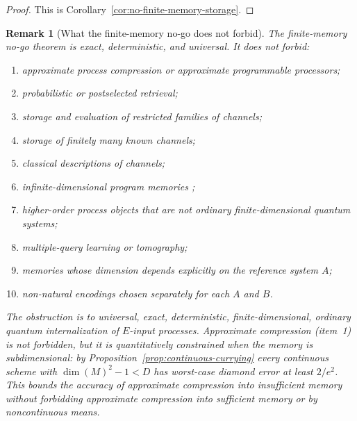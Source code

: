 \documentclass[11pt]{article}
\newtheorem{remark}[theorem]{Remark}
\begin{document}
\begin{proof}
This is Corollary~\ref{cor:no-finite-memory-storage}.
\end{proof}

\begin{remark}[What the finite-memory no-go does not forbid]
\label{rem:escape-routes}
The finite-memory no-go theorem is exact, deterministic, and universal. It
does not forbid:
\begin{enumerate}
\item approximate process compression or approximate programmable
processors;
\item probabilistic or postselected retrieval;
\item storage and evaluation of restricted families of channels;
\item storage of finitely many known channels;
\item classical descriptions of channels;
\item infinite-dimensional program memories \cite{GschwendtnerWinter2021};
\item higher-order process objects that are not ordinary finite-dimensional
quantum systems;
\item multiple-query learning or tomography;
\item memories whose dimension depends explicitly on the reference system
$A$;
\item non-natural encodings chosen separately for each $A$ and $B$.
\end{enumerate}
The obstruction is to universal, exact, deterministic, finite-dimensional,
ordinary quantum internalization of $E$-input processes. Approximate
compression (item~1) is not forbidden, but it is quantitatively constrained
when the memory is subdimensional: by Proposition~\ref{prop:continuous-currying}
every continuous scheme with $\dim(M)^2-1<D$ has worst-case diamond error at
least $2/e^2$. This bounds the accuracy of approximate compression into
insufficient memory without forbidding approximate compression into sufficient
memory or by noncontinuous means.
\end{remark}
\end{document}
